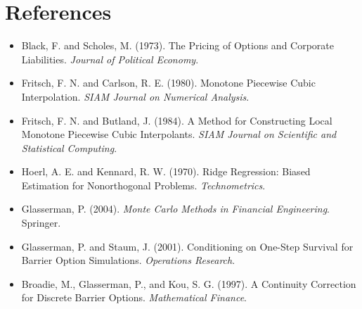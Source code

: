 \documentclass[11pt,oneside]{book}
\theoremstyle{definition}
\begin{document}
\chapter{References}
\begin{itemize}
  \item Black, F. and Scholes, M. (1973). The Pricing of Options and Corporate Liabilities. \emph{Journal of Political Economy}.
  \item Fritsch, F. N. and Carlson, R. E. (1980). Monotone Piecewise Cubic Interpolation. \emph{SIAM Journal on Numerical Analysis}.
  \item Fritsch, F. N. and Butland, J. (1984). A Method for Constructing Local Monotone Piecewise Cubic Interpolants. \emph{SIAM Journal on Scientific and Statistical Computing}.
  \item Hoerl, A. E. and Kennard, R. W. (1970). Ridge Regression: Biased Estimation for Nonorthogonal Problems. \emph{Technometrics}.
  \item Glasserman, P. (2004). \emph{Monte Carlo Methods in Financial Engineering}. Springer.
  \item Glasserman, P. and Staum, J. (2001). Conditioning on One-Step Survival for Barrier Option Simulations. \emph{Operations Research}.
  \item Broadie, M., Glasserman, P., and Kou, S. G. (1997). A Continuity Correction for Discrete Barrier Options. \emph{Mathematical Finance}.
\end{itemize}
\end{document}
